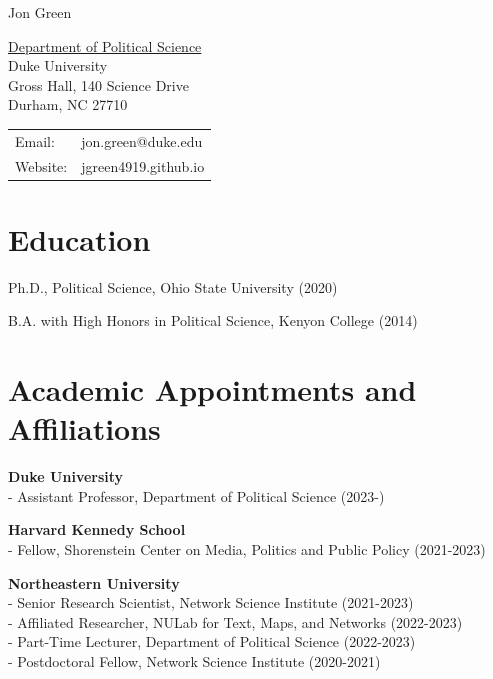 \documentclass[letterpaper]{article}
\def\name{Jon Green}
\renewenvironment{itemize}{
  \begin{list}{}{
    \setlength{\leftmargin}{1.5em}
  }
}{
  \end{list}
}
\begin{document}
{\huge \name}


\vspace{0.1in}

\begin{minipage}{0.45\linewidth}
  \href{https://polisci.duke.edu//}{Department of Political Science} \\
    Duke University \\
    Gross Hall, 140 Science Drive\\
    Durham, NC 27710
\end{minipage}
\begin{minipage}{0.45\linewidth}
  \begin{tabular}{ll}
    Email: & jon.green@duke.edu \\
    Website: & jgreen4919.github.io \\
  \end{tabular}
\end{minipage}

\section*{Education}

\begin{itemize}
    \item Ph.D., Political Science, Ohio State University (2020)
	\item B.A. with High Honors in Political Science, Kenyon College (2014)
\end{itemize}

\section*{Academic Appointments and Affiliations}
\begin{itemize}

\item \textbf{Duke University} \\
- Assistant Professor, Department of Political Science (2023-)

\item \textbf{Harvard Kennedy School} \\
- Fellow, Shorenstein Center on Media, Politics and Public Policy (2021-2023)

\item \textbf{Northeastern University} \\
- Senior Research Scientist, Network Science Institute (2021-2023)\\
- Affiliated Researcher, NULab for Text, Maps, and Networks (2022-2023) \\
- Part-Time Lecturer, Department of Political Science (2022-2023)\\
- Postdoctoral Fellow, Network Science Institute  (2020-2021)

\end{itemize}
\end{document}
